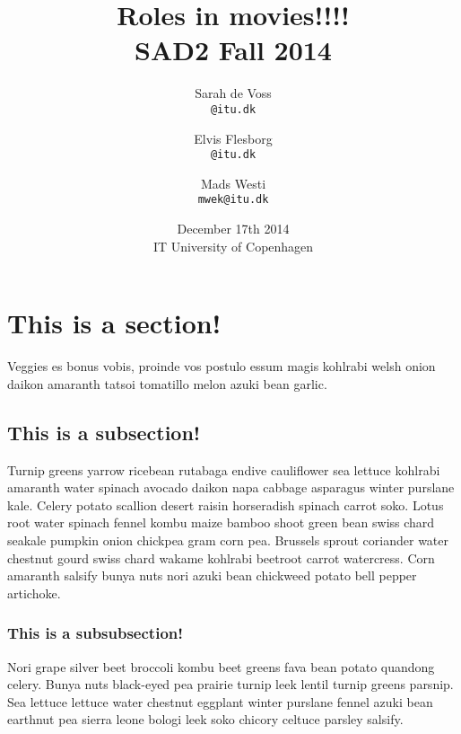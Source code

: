 \documentclass[a4paper,11pt]{article}
\begin{document}
\date{December 17th 2014\\ IT University of Copenhagen}
\title{Roles in movies!!!!\\SAD2 Fall 2014}

\author{Sarah de Voss\\
\texttt{@itu.dk}
\and Elvis Flesborg\\
\texttt{@itu.dk}
\and Mads Westi\\
\texttt{mwek@itu.dk}}
\clearpage\maketitle
\newpage
\thispagestyle{empty}
\setcounter{page}{1}
\tableofcontents
\newpage
\section{This is a section!}
Veggies es bonus vobis, proinde vos postulo essum magis kohlrabi welsh onion daikon amaranth tatsoi tomatillo melon azuki bean garlic. \\

\subsection{This is a subsection!}
Turnip greens yarrow ricebean rutabaga endive cauliflower sea lettuce kohlrabi amaranth water spinach avocado daikon napa cabbage asparagus winter purslane kale. Celery potato scallion desert raisin horseradish spinach carrot soko. Lotus root water spinach fennel kombu maize bamboo shoot green bean swiss chard seakale pumpkin onion chickpea gram corn pea. Brussels sprout coriander water chestnut gourd swiss chard wakame kohlrabi beetroot carrot watercress. Corn amaranth salsify bunya nuts nori azuki bean chickweed potato bell pepper artichoke. \\

\subsubsection{This is a subsubsection!}
Nori grape silver beet broccoli kombu beet greens fava bean potato quandong celery. Bunya nuts black-eyed pea prairie turnip leek lentil turnip greens parsnip. Sea lettuce lettuce water chestnut eggplant winter purslane fennel azuki bean earthnut pea sierra leone bologi leek soko chicory celtuce parsley salsify. \\
\end{document}
